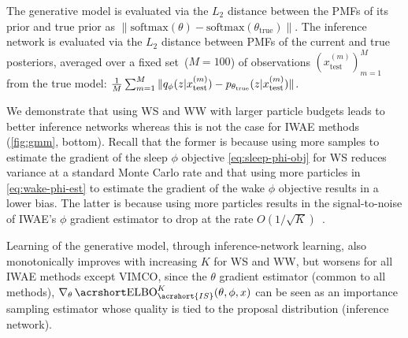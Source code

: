 The generative model is evaluated via the $L_2$ distance between the \glspl{PMF} of its prior and true prior as $\|\mathrm{softmax}(\theta) - \mathrm{softmax}(\theta_\text{true})\|$.
The inference network is evaluated via the $L_2$ distance between \glspl{PMF} of the current and true posteriors, averaged over a fixed set~(\(M=100\)) of observations $(x_{\text{test}}^{(m)})_{m = 1}^{M}$ from the true model: $\frac{1}{M} \sum_{m = 1}^M \|q_\phi(z \lvert x_{\text{test}}^{(m)}) - p_{\theta_{\text{true}}}(z \lvert x_{\text{test}}^{(m)})\|$.

We demonstrate that using \gls{WS} and \gls{WW} with larger particle budgets leads to better inference networks whereas this is not the case for \gls{IWAE} methods (\cref{fig:gmm}, bottom).
Recall that the former is because using more samples to estimate the gradient of the sleep $\phi$ objective \cref{eq:sleep-phi-obj} for \gls{WS} reduces variance at a standard Monte Carlo rate and that using more particles in \cref{eq:wake-phi-est} to estimate the gradient of the wake $\phi$ objective results in a lower bias.
The latter is because using more particles results in the signal-to-noise of \gls{IWAE}'s $\phi$ gradient estimator to drop at the rate $O(1 / \sqrt{K})$~\citep{Rainforth2018tighter}.

Learning of the generative model, through inference-network learning, also monotonically improves with increasing \(K\) for \gls{WS} and \gls{WW}, but worsens for all \gls{IWAE} methods except \gls{VIMCO}, since the $\theta$ gradient estimator (common to all methods), $\nabla_\theta \ELBO_{\acrshort{IS}}^K(\theta, \phi, x)$ can be seen as an importance sampling estimator whose quality is tied to the proposal distribution (inference network).

